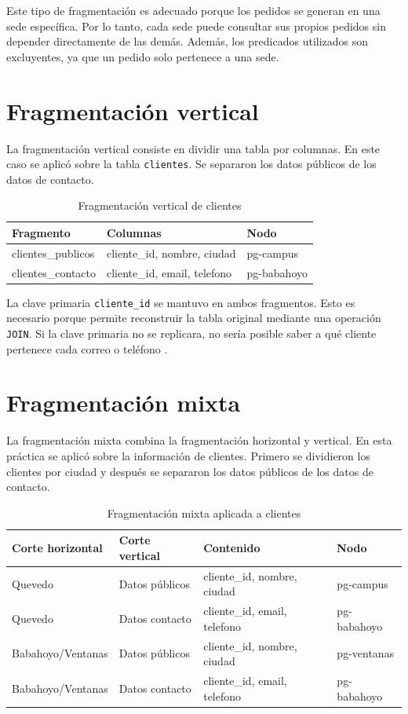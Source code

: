 \documentclass[12pt,a4paper]{article}
\begin{document}
Este tipo de fragmentación es adecuado porque los pedidos se generan en una sede específica. Por lo tanto, cada sede puede consultar sus propios pedidos sin depender directamente de las demás. Además, los predicados utilizados son excluyentes, ya que un pedido solo pertenece a una sede.

\section{Fragmentación vertical}

La fragmentación vertical consiste en dividir una tabla por columnas. En este caso se aplicó sobre la tabla \texttt{clientes}. Se separaron los datos públicos de los datos de contacto.

\begin{table}[H]
\centering
\caption{Fragmentación vertical de clientes}
\begin{tabular}{lll}
\toprule
\textbf{Fragmento} & \textbf{Columnas} & \textbf{Nodo} \\
\midrule
clientes\_publicos & cliente\_id, nombre, ciudad & pg-campus \\
clientes\_contacto & cliente\_id, email, telefono & pg-babahoyo \\
\bottomrule
\end{tabular}
\end{table}

La clave primaria \texttt{cliente\_id} se mantuvo en ambos fragmentos. Esto es necesario porque permite reconstruir la tabla original mediante una operación \texttt{JOIN}. Si la clave primaria no se replicara, no sería posible saber a qué cliente pertenece cada correo o teléfono \cite{amer2020heliyon}.

\section{Fragmentación mixta}

La fragmentación mixta combina la fragmentación horizontal y vertical. En esta práctica se aplicó sobre la información de clientes. Primero se dividieron los clientes por ciudad y después se separaron los datos públicos de los datos de contacto.

\begin{table}[H]
\centering
\caption{Fragmentación mixta aplicada a clientes}
\begin{tabular}{llll}
\toprule
\textbf{Corte horizontal} & \textbf{Corte vertical} & \textbf{Contenido} & \textbf{Nodo} \\
\midrule
Quevedo & Datos públicos & cliente\_id, nombre, ciudad & pg-campus \\
Quevedo & Datos contacto & cliente\_id, email, telefono & pg-babahoyo \\
Babahoyo/Ventanas & Datos públicos & cliente\_id, nombre, ciudad & pg-ventanas \\
Babahoyo/Ventanas & Datos contacto & cliente\_id, email, telefono & pg-babahoyo \\
\bottomrule
\end{tabular}
\end{table}
\end{document}
